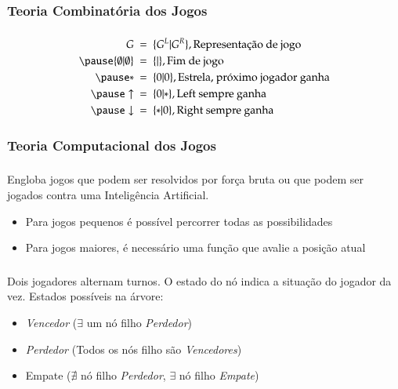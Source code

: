 \subsubsection{Teoria Combinatória dos Jogos}
\begin{frame}[fragile]
\frametitle{\subsubsecname}
\begin{equation*}
\begin{split}
  G\ &=\ \{G^L|G^R\}, \text{Representação de jogo}\\
  \pause
  \{\emptyset|\emptyset\}\ &=\ \{|\}, \text{Fim de jogo}\\
  \pause
  *\ &=\ \{0|0\}, \text{Estrela, próximo jogador ganha}\\
  \pause
  \uparrow\ &=\ \{0|*\}, \text{Left sempre ganha}\\
  \pause
  \downarrow\ &=\ \{*|0\}, \text{Right sempre ganha}\\
\end{split}
\end{equation*}
\end{frame}

\subsubsection{Teoria Computacional dos Jogos}
\begin{frame}[fragile]
\frametitle{\subsubsecname}
Engloba jogos que podem ser resolvidos por força bruta ou que podem ser jogados contra uma Inteligência Artificial.
\begin{itemize}
	\item Para jogos pequenos é possível percorrer todas as possibilidades
	\item Para jogos maiores, é necessário uma função que avalie a posição atual
\end{itemize}
\end{frame}

\begin{frame}[fragile]
\frametitle{\subsubsecname}
Dois jogadores alternam turnos. O estado do nó indica a situação do jogador da vez. Estados possíveis na árvore:
\begin{itemize}
	\item[\textcolor{green}{\textbullet}] \emph{Vencedor} ($\exists$ um nó filho \emph{Perdedor})
	\item[\textcolor{red}{\textbullet}] \emph{Perdedor} (Todos os nós filho são \emph{Vencedores})
	\item[\textcolor{yellow}{\textbullet}] Empate ($\nexists$ nó filho \emph{Perdedor}, $\exists$ nó filho \emph{Empate})
\end{itemize}
\end{frame}

